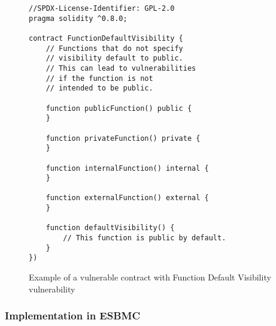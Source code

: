 \begin{figure}
\begin{lstlisting}
//SPDX-License-Identifier: GPL-2.0
pragma solidity ^0.8.0;

contract FunctionDefaultVisibility {
    // Functions that do not specify
    // visibility default to public.
    // This can lead to vulnerabilities
    // if the function is not
    // intended to be public.

    function publicFunction() public {
    }

    function privateFunction() private {
    }

    function internalFunction() internal {
    }

    function externalFunction() external {
    }

    function defaultVisibility() {
        // This function is public by default.
    }
})
\end{lstlisting}
\caption{Example of a vulnerable contract with Function Default Visibility vulnerability}
\label{fig:default_visibility}
\end{figure}

\subsubsection{Implementation in ESBMC}
